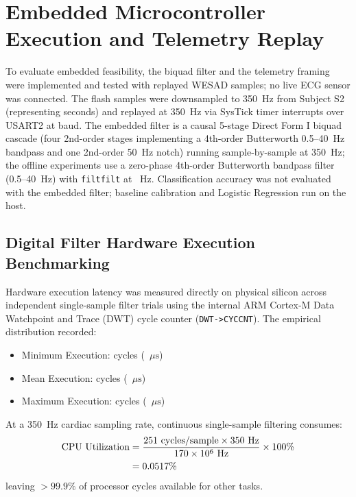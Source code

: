 \documentclass[conference]{IEEEtran}
\begin{document}
\begin{table}[t]
\centering
\caption{Decision Threshold Sensitivity Comparison on 295 Windows}
\label{tab:thresholds}
{\footnotesize
\setlength{\tabcolsep}{4pt}

}
\end{table}

\section{Embedded Microcontroller Execution and Telemetry Replay}

To evaluate embedded feasibility, the biquad filter and the telemetry framing were implemented and tested with replayed WESAD samples; no live ECG sensor was connected. The \valFlashSampleCount flash samples were downsampled to 350~Hz from Subject S2 (representing \valFlashSampleSec seconds) and replayed at 350~Hz via SysTick timer interrupts over USART2 at \valUartBaudRate baud. The embedded filter is a causal 5-stage Direct Form I biquad cascade (four 2nd-order stages implementing a 4th-order Butterworth 0.5--40~Hz bandpass and one 2nd-order 50~Hz notch) running sample-by-sample at 350~Hz; the offline experiments use a zero-phase 4th-order Butterworth bandpass filter (0.5--40~Hz) with \texttt{filtfilt} at \valSamplingRateHz~Hz. Classification accuracy was not evaluated with the embedded filter; baseline calibration and Logistic Regression run on the host.

\subsection{Digital Filter Hardware Execution Benchmarking}
Hardware execution latency was measured directly on physical silicon across \valDwtTrialCount independent single-sample filter trials using the internal ARM Cortex-M Data Watchpoint and Trace (DWT) cycle counter (\texttt{DWT->CYCCNT}). The empirical distribution recorded:
\begin{itemize}
    \item Minimum Execution: \valBiquadMinCycles cycles (\valBiquadMinUs~$\mu\text{s}$)
    \item Mean Execution: \valBiquadMeanCycles cycles (\valBiquadMeanUs~$\mu\text{s}$)
    \item Maximum Execution: \valBiquadMaxCycles cycles (\valBiquadMaxUs~$\mu\text{s}$)
\end{itemize}

At a 350~Hz cardiac sampling rate, continuous single-sample filtering consumes:
\begin{equation}
\begin{aligned}
    \text{CPU Utilization} &= \frac{251 \text{ cycles/sample} \times 350 \text{ Hz}}{170 \times 10^6 \text{ Hz}} \times 100\% \\
    &= 0.0517\%
\end{aligned}
\end{equation}
leaving $>99.9\%$ of processor cycles available for other tasks.
\end{document}
